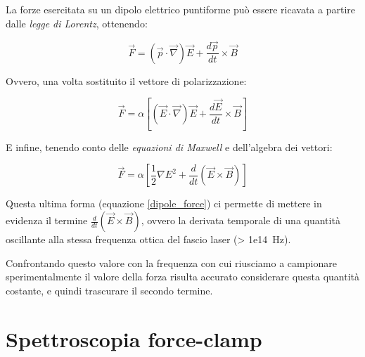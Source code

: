 La forze esercitata su un dipolo elettrico puntiforme può essere ricavata a partire dalle \emph{legge di Lorentz}, ottenendo:

$$ \vec{F} =
  \left( \vec{p} \cdot \vec{\nabla} \right) \vec{E}
  + \frac{d\vec{p}}{dt} \times \vec{B}
$$

Ovvero, una volta sostituito il vettore di polarizzazione:

$$ \vec{F} = \alpha
\left[
    \left( \vec{E} \cdot \vec{\nabla} \right) \vec{E}
    + \frac{d\vec{E}}{dt} \times \vec{B}
\right]
$$

E infine, tenendo conto delle \emph{equazioni di Maxwell} e dell'algebra dei vettori:

\begin{equation}
\label{dipole_force}
\vec{F}
= \alpha 
\left[
    \frac{1}{2}\nabla E^2
    + \frac{d}{dt}\left(\vec{E} \times \vec{B}\right)
\right]
\end{equation}

Questa ultima forma (equazione \ref{dipole_force}) ci permette di mettere in evidenza il termine $\frac{d}{dt}(\vec{E} \times \vec{B})$, ovvero la derivata temporale di una quantità oscillante alla stessa frequenza ottica del fascio laser (\SI{> 1e14}{\Hz}).

Confrontando questo valore con la frequenza con cui riusciamo a campionare sperimentalmente il valore della forza risulta accurato considerare questa quantità costante, e quindi trascurare il secondo termine.


\section{Spettroscopia force-clamp}

